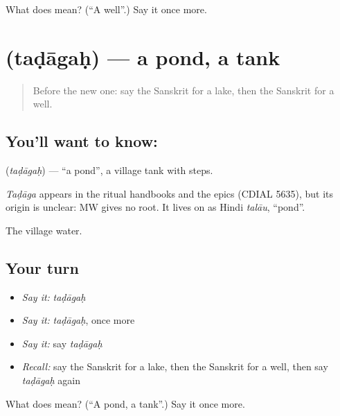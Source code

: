 \begin{tcolorbox}[breakable,colback=teal!4,colframe=teal!35!black,title={Before you move on}]
What does  mean? (\textquotedblleft{}A well\textquotedblright{}.) Say it once more.
\end{tcolorbox}
\section[\texorpdfstring{\sk{तडागः} (taḍāgaḥ)}{तडागः (taḍāgaḥ)}]{ (taḍāgaḥ) — a pond, a tank}

\label{lesson:SA-C82-pond}



\begin{quote}
Before the new one: say the Sanskrit for a lake, then the Sanskrit for a well.
\end{quote}

\subsection*{You'll want to know: }
\textbf{} (\emph{taḍāgaḥ}) — \textquotedblleft{}a pond\textquotedblright{}, a village tank with steps.

\begin{cousinweb}
\emph{Taḍāga} appears in the ritual handbooks and the epics (CDIAL 5635), but its origin is unclear: MW gives no root. It lives on as Hindi \emph{talāu}, \textquotedblleft{}pond\textquotedblright{}.
\end{cousinweb}

\begin{grammarlens}[title={What you've built}]
The village water.
\end{grammarlens}

\subsection*{Your turn}
\begin{itemize}
\raggedright
  \item \emph{Say it:} \emph{taḍāgaḥ}
  \item \emph{Say it:} \emph{taḍāgaḥ}, once more
  \item \emph{Say it:} say \emph{taḍāgaḥ}
  \item \emph{Recall:} say the Sanskrit for a lake, then the Sanskrit for a well, then say \emph{taḍāgaḥ} again
\end{itemize}

\begin{tcolorbox}[breakable,colback=teal!4,colframe=teal!35!black,title={Before you move on}]
What does  mean? (\textquotedblleft{}A pond, a tank\textquotedblright{}.) Say it once more.
\end{tcolorbox}
